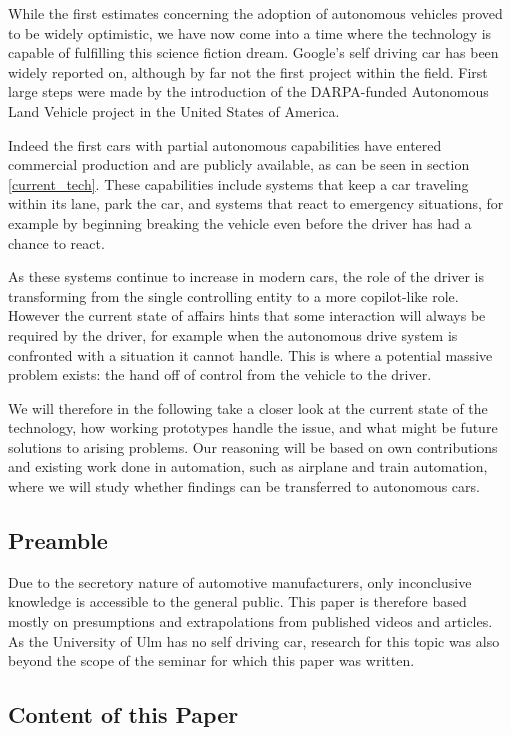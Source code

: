 \documentclass{acm_proc_article-sp}
\begin{document}
While the first estimates concerning the adoption of autonomous vehicles proved to be widely optimistic, we have now come into a time where the technology is capable of fulfilling this science fiction dream.
Google's self driving car \cite{www:google_car} has been widely reported on, although by far not the first project within the field.
First large steps were made by the introduction of the DARPA-funded Autonomous Land Vehicle project in the United States of America.

Indeed the first cars with partial autonomous capabilities have entered commercial production and are publicly available, as can be seen in section \ref{current_tech}.
These capabilities include systems that keep a car traveling within its lane, park the car, and systems that react to emergency situations, for example by beginning breaking the vehicle even before the driver has had a chance to react.

As these systems continue to increase in modern cars, the role of the driver is transforming from the single controlling entity to a more copilot-like role.
However the current state of affairs hints that some interaction will always be required by the driver, for example when the autonomous drive system is confronted with a situation it cannot handle.
This is where a potential massive problem exists: the hand off of control from the vehicle to the driver.

We will therefore in the following take a closer look at the current state of the technology, how working prototypes handle the issue, and what might be future solutions to arising problems.
Our reasoning will be based on own contributions and existing work done in automation, such as airplane and train automation, where we will study whether findings can be transferred to autonomous cars.

\subsection{Preamble}

Due to the secretory nature of automotive manufacturers, only inconclusive knowledge is accessible to the general public.
This paper is therefore based mostly on presumptions and extrapolations from published videos and articles.
As the University of Ulm has no self driving car, research for this topic was also beyond the scope of the seminar for which this paper was written.

\subsection{Content of this Paper}
\end{document}
